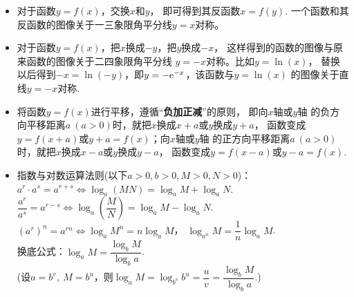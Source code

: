 \begin{itemize}[leftmargin=\inteval{\myitemleftmargin}pt,itemsep=
   \inteval{\myitemitempsep}pt,topsep=\inteval{\myitemtopsep}pt]
\item 对于函数$ y=f(x) $，交换$ x $和$ y $，
即可得到其反函数$ x=f(y) $.
一个函数和其反函数的图像关于一三象限角平分线$ y=x $对称。

\item 对于函数$ y=f(x) $，把$ x $换成$ -y $，把$ y $换成$ -x $，
这样得到的函数的图像与原来函数的图像关于二四象限角平分线
$ y=-x $对称。比如$ y=\ln(x) $，
替换以后得到$ -x=\ln(-y) $，即$ y=-\mathrm{e}^{-x} $，该函数与$ y=\ln(x) $
的图像关于直线$ y=-x $对称.

\item 将函数$y=f(x)$进行平移，遵循“\textbf{负加正减}”的原则，
即向$x$轴或$y$轴
的负方向平移距离$a\:(a>0)$时，就把$x$换成$x+a$或$y$换成$y+a$，
函数变成$y=f(x+a)$或$y+a=f(x)$；向$x$轴或$y$轴
的正方向平移距离$a\:(a>0)$时，就把$x$换成$x-a$或$y$换成$y-a$，
函数变成$y=f(x-a)$或$y-a=f(x)$.

\item 指数与对数运算法则(以下$a>0,b>0,M>0,N>0$)：\\ 
$a^r\cdot a^s=a^{r+s} \Longleftrightarrow
\log_a (MN)= \log_a M+\log_a N $. \\
$ \dfrac{a^r}{a^s}=a^{r-s} \Longleftrightarrow
\log_a \left(\dfrac{M}{N}\right)=
\log_a M-\log_a N $. \\
$ (a^r)^n = a^{rn} \Longleftrightarrow 
\log_a M^n= n\log_a M $，\q 
$ \log_{a^n} M=\dfrac{1}{n}\log_a M $. \\
换底公式：$ \log_a M=\dfrac{\log_b M}{\log_b a} $.\\
(设$a=b^v,\ M=b^u$，则$\log_a M=\log_{b^v} b^u=
\dfrac{u}{v}=\dfrac{\log_b M}{\log_b a}$.)


\end{itemize}

